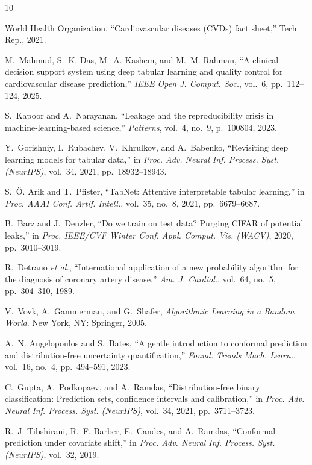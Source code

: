 \documentclass[journal]{IEEEtran}
\begin{document}

\begin{thebibliography}{10}

World Health Organization, ``Cardiovascular diseases (CVDs) fact sheet,'' Tech. Rep., 2021.

M.~Mahmud, S.~K. Das, M.~A. Kashem, and M.~M. Rahman, ``A clinical decision support system using deep tabular learning and quality control for cardiovascular disease prediction,'' \textit{IEEE Open J. Comput. Soc.}, vol.~6, pp.~112--124, 2025.

S.~Kapoor and A.~Narayanan, ``Leakage and the reproducibility crisis in machine-learning-based science,'' \textit{Patterns}, vol.~4, no.~9, p.~100804, 2023.

Y.~Gorishniy, I.~Rubachev, V.~Khrulkov, and A.~Babenko, ``Revisiting deep learning models for tabular data,'' in \textit{Proc. Adv. Neural Inf. Process. Syst. (NeurIPS)}, vol.~34, 2021, pp.~18932--18943.

S.~{\"O}. Arik and T.~Pfister, ``TabNet: Attentive interpretable tabular learning,'' in \textit{Proc. AAAI Conf. Artif. Intell.}, vol.~35, no.~8, 2021, pp.~6679--6687.

B.~Barz and J.~Denzler, ``Do we train on test data? Purging CIFAR of potential leaks,'' in \textit{Proc. IEEE/CVF Winter Conf. Appl. Comput. Vis. (WACV)}, 2020, pp.~3010--3019.

R.~Detrano \textit{et al.}, ``International application of a new probability algorithm for the diagnosis of coronary artery disease,'' \textit{Am. J. Cardiol.}, vol.~64, no.~5, pp.~304--310, 1989.

V.~Vovk, A.~Gammerman, and G.~Shafer, \textit{Algorithmic Learning in a Random World}. New York, NY: Springer, 2005.

A.~N. Angelopoulos and S.~Bates, ``A gentle introduction to conformal prediction and distribution-free uncertainty quantification,'' \textit{Found. Trends Mach. Learn.}, vol.~16, no.~4, pp.~494--591, 2023.

C.~Gupta, A.~Podkopaev, and A.~Ramdas, ``Distribution-free binary classification: Prediction sets, confidence intervals and calibration,'' in \textit{Proc. Adv. Neural Inf. Process. Syst. (NeurIPS)}, vol.~34, 2021, pp.~3711--3723.

R.~J. Tibshirani, R.~F. Barber, E.~Candes, and A.~Ramdas, ``Conformal prediction under covariate shift,'' in \textit{Proc. Adv. Neural Inf. Process. Syst. (NeurIPS)}, vol.~32, 2019.


\end{thebibliography}
\end{document}
